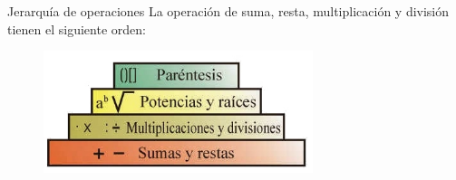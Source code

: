 \begin{infocard}{Jerarquía de operaciones}
    La operación de suma, resta, multiplicación y división tienen el siguiente orden:
    \begin{figure}[H]
        \centering
        \includegraphics[width=0.7\textwidth]{../images/jerarquia.jpg}
    \end{figure}
\end{infocard}




